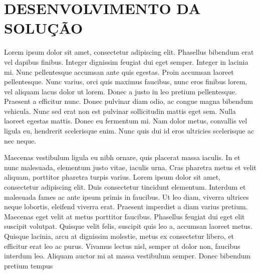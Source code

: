 \chapter{DESENVOLVIMENTO DA SOLUÇÃO}\label{ch:proposta}
Lorem ipsum dolor sit amet, consectetur adipiscing elit. Phasellus bibendum erat vel dapibus finibus. Integer dignissim feugiat dui eget semper. Integer in lacinia mi. Nunc pellentesque accumsan ante quis egestas. Proin accumsan laoreet pellentesque. Nunc varius, orci quis maximus faucibus, nunc eros finibus lorem, vel aliquam lacus dolor ut lorem. Donec a justo in leo pretium pellentesque. Praesent a efficitur nunc. Donec pulvinar diam odio, ac congue magna bibendum vehicula. Nunc sed erat non est pulvinar sollicitudin mattis eget sem. Nulla laoreet egestas mattis. Donec eu fermentum mi. Nam dolor metus, convallis vel ligula eu, hendrerit scelerisque enim. Nunc quis dui id eros ultricies scelerisque ac nec neque.

Maecenas vestibulum ligula eu nibh ornare, quis placerat massa iaculis. In et nunc malesuada, elementum justo vitae, iaculis urna. Cras pharetra metus et velit aliquam, porttitor pharetra turpis varius. Lorem ipsum dolor sit amet, consectetur adipiscing elit. Duis consectetur tincidunt elementum. Interdum et malesuada fames ac ante ipsum primis in faucibus. Ut leo diam, viverra ultrices neque lobortis, eleifend viverra erat. Praesent imperdiet a diam varius pretium. Maecenas eget velit at metus porttitor faucibus. Phasellus feugiat dui eget elit suscipit volutpat. Quisque velit felis, suscipit quis leo a, accumsan laoreet metus. Quisque lacinia, arcu at dignissim molestie, metus ex consectetur libero, et efficitur erat leo ac purus. Vivamus lectus nisl, semper at dolor non, faucibus interdum leo. Aliquam auctor mi at massa vestibulum semper. Donec bibendum pretium tempus